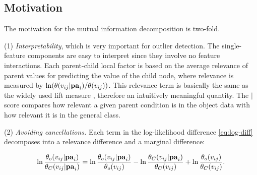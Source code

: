 \documentclass[conference]{IEEEtran}
\begin{document}

\subsection{Motivation} 
%
The motivation for the mutual information decomposition is two-fold. 

\noindent
(1) {\em Interpretability}, which is very important for outlier detection. The single-feature components are easy to interpret since they involve no feature interactions. Each parent-child local factor is based on the average relevance of parent values for predicting the value of the child node, where relevance is measured by $\ln (\theta(v_{ij}|\mathbf{pa}_{i})/\theta(v_{ij}))$. This relevance term  is basically the same as the widely used lift measure \cite{Tuffery2011}, therefore an intuitively meaningful quantity. The $\mid$ score compares how relevant a given parent condition is in the object data with how relevant it is in the general class. 

\noindent
(2) {\em Avoiding cancellations.} Each term in the log-likelihood difference \eqref{eq:log-diff} decomposes into a relevance difference and a marginal difference: 

\begin{equation} \label{eq:decompose}
\ln \frac{\parameter_{\object}( \nodevalue_{ij}|\parents_{i})}{\parameter_{\Class}( \nodevalue_{ij}|\parents_{i})} = \ln \frac{\parameter_{\object}(\nodevalue_{ij}|\parents_{i})}{\parameter_{\object}(\nodevalue_{ij})} - \ln \frac{\parameter_{\Class}( \nodevalue_{ij}|\parents_{i})}{\parameter_{\Class}(\nodevalue_{ij})} + \ln \frac{\parameter_{\object}( \nodevalue_{ij})}{\parameter_{\Class}( \nodevalue_{ij})}.
\end{equation}
\end{document}
